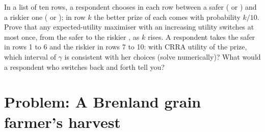 \begin{exercise}[$\star\star\star$]\label{exo:b2:expected-utility:12}
In a list of ten rows, a respondent chooses in each row between a safer  ( or
) and a riskier one ( or ); in row $k$ the better prize of each comes with
probability $k/10$. Prove that any expected-utility maximiser with an increasing utility switches at
most once, from the safer to the riskier , as $k$ rises. A respondent takes the safer 
in rows 1 to 6 and the riskier in rows 7 to 10: with CRRA utility of the prize, which interval of
$\gamma$ is consistent with her choices (solve numerically)? What would a respondent who switches back
and forth tell you?
\end{exercise}

\section{Problem: A Brenland grain farmer's harvest}\label{sec:b2:expected-utility:problem}

